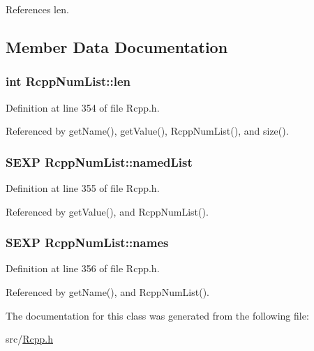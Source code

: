 References len.

\subsection{Member Data Documentation}
\hypertarget{classRcppNumList_ac4cb5c784f7105f0f28ae48d02deb3a1}{
\subsubsection[{len}]{\setlength{\rightskip}{0pt plus 5cm}int {\bf RcppNumList::len}}}
\label{classRcppNumList_ac4cb5c784f7105f0f28ae48d02deb3a1}


Definition at line 354 of file Rcpp.h.

Referenced by getName(), getValue(), RcppNumList(), and size().\hypertarget{classRcppNumList_a7464927aafe555a0c4a104247dba7185}{
\subsubsection[{namedList}]{\setlength{\rightskip}{0pt plus 5cm}SEXP {\bf RcppNumList::namedList}}}
\label{classRcppNumList_a7464927aafe555a0c4a104247dba7185}


Definition at line 355 of file Rcpp.h.

Referenced by getValue(), and RcppNumList().\hypertarget{classRcppNumList_aa669b28cba0c95531a3c92910a60ecb0}{
\subsubsection[{names}]{\setlength{\rightskip}{0pt plus 5cm}SEXP {\bf RcppNumList::names}}}
\label{classRcppNumList_aa669b28cba0c95531a3c92910a60ecb0}


Definition at line 356 of file Rcpp.h.

Referenced by getName(), and RcppNumList().

The documentation for this class was generated from the following file:\begin{DoxyCompactItemize}
\item 
src/\hyperlink{Rcpp_8h}{Rcpp.h}\end{DoxyCompactItemize}
